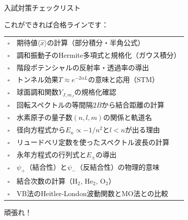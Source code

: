 \documentclass[aspectratio=169, 11pt]{beamer}
\begin{document}
\begin{frame}[shrink=5]{入試対策チェックリスト}

\begin{block}{これができれば合格ラインです：}
  {\small
  \begin{tabular}{cl}
    $\square$ & 期待値$\langle\hat{x}\rangle$の計算（部分積分・半角公式） \\
    $\square$ & 調和振動子のHermite多項式と規格化（ガウス積分） \\
    $\square$ & 階段ポテンシャルの反射率・透過率の導出 \\
    $\square$ & トンネル効果$T \approx e^{-2\alpha L}$の意味と応用（STM） \\
    $\square$ & 球面調和関数$Y_{J,m_J}$の規格化確認 \\
    $\square$ & 回転スペクトルの等間隔$2B$から結合距離の計算 \\
    $\square$ & 水素原子の量子数$(n,l,m)$の関係と軌道名 \\
    $\square$ & 径向方程式から$E_n \propto -1/n^2$と$l < n$が出る理由 \\
    $\square$ & リュードベリ定数を使ったスペクトル波長の計算 \\
    $\square$ & 永年方程式の行列式と$E_\pm$の導出 \\
    $\square$ & $\psi_+$（結合性）と$\psi_-$（反結合性）の物理的意味 \\
    $\square$ & 結合次数の計算（$\mathrm{H}_2$, $\mathrm{He}_2$, $\mathrm{O}_2$） \\
    $\square$ & VB法のHeitler-London波動関数とMO法との比較 \\
  \end{tabular}
  }
\end{block}
\end{frame}

\begin{frame}[standout]
  頑張れ！
\end{frame}
\end{document}
